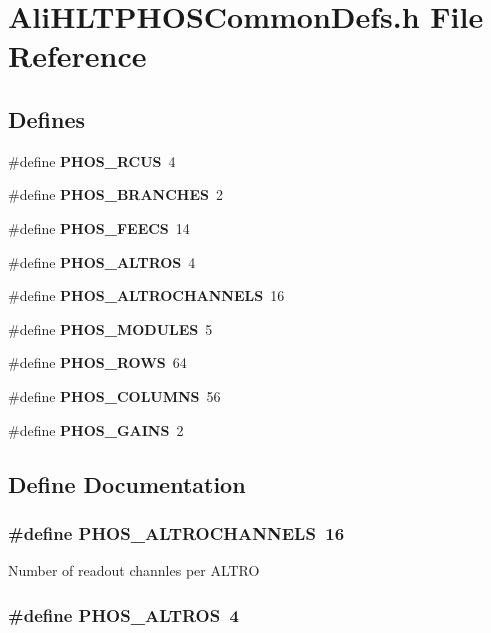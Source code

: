 \section{Ali\-HLTPHOSCommon\-Defs.h File Reference}
\label{AliHLTPHOSCommonDefs_8h}
\subsection*{Defines}
\begin{CompactItemize}
\item 
\#define {\bf PHOS\_\-RCUS}\ 4
\item 
\#define {\bf PHOS\_\-BRANCHES}\ 2
\item 
\#define {\bf PHOS\_\-FEECS}\ 14
\item 
\#define {\bf PHOS\_\-ALTROS}\ 4
\item 
\#define {\bf PHOS\_\-ALTROCHANNELS}\ 16
\item 
\#define {\bf PHOS\_\-MODULES}\ 5
\item 
\#define {\bf PHOS\_\-ROWS}\ 64
\item 
\#define {\bf PHOS\_\-COLUMNS}\ 56
\item 
\#define {\bf PHOS\_\-GAINS}\ 2
\end{CompactItemize}


\subsection{Define Documentation}
\subsubsection{\setlength{\rightskip}{0pt plus 5cm}\#define PHOS\_\-ALTROCHANNELS\ 16}\label{AliHLTPHOSCommonDefs_8h_a4}


Number of readout channles per ALTRO 
\subsubsection{\setlength{\rightskip}{0pt plus 5cm}\#define PHOS\_\-ALTROS\ 4}\label{AliHLTPHOSCommonDefs_8h_a3}


